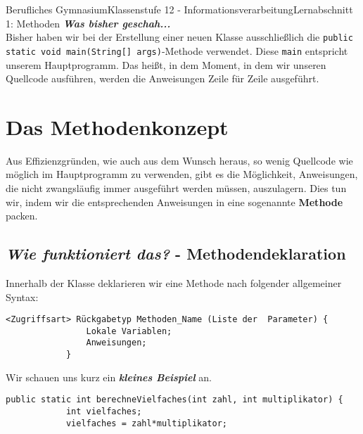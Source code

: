 \documentclass[11pt,oneside,openany,headings=optiontotoc,11pt,numbers=noenddot]{article}
\begin{document}
	\begin{worksheet}{Berufliches Gymnasium}{Klassenstufe 12 - Informationsverarbeitung}{Lernabschnitt 1: Methoden}
		\setlength{\columnseprule}{0pt}
		\setcounter{section}{2}
		\textit{\textbf{Was bisher geschah...}}\\
		Bisher haben wir bei der Erstellung einer neuen Klasse ausschließlich die \lstinline[style=JavaInputStyle,backgroundcolor=\color{backcolor}]|public static void main(String[] args)|-Methode verwendet. Diese \lstinline[style=JavaInputStyle,backgroundcolor=\color{backcolor}]|main| entspricht unserem Hauptprogramm. Das heißt, in dem Moment, in dem wir unseren Quellcode ausführen, werden die Anweisungen Zeile für Zeile ausgeführt.\\
		\section{Das Methodenkonzept}
		Aus Effizienzgründen, wie auch aus dem Wunsch heraus, so wenig Quellcode wie möglich im Hauptprogramm zu verwenden, gibt es die Möglichkeit, Anweisungen, die nicht zwangsläufig immer ausgeführt werden müssen, auszulagern. Dies tun wir, indem wir die entsprechenden Anweisungen in eine sogenannte \textbf{Methode} packen.
		\subsection{\textit{Wie funktioniert das?} - Methodendeklaration}
		Innerhalb der Klasse deklarieren wir eine Methode nach folgender allgemeiner Syntax:
		\begin{lstlisting}[style=JavaInputStyle]
			<Zugriffsart> Rückgabetyp Methoden_Name (Liste der  Parameter) {
				Lokale Variablen;
				Anweisungen;
			}
		\end{lstlisting}
		Wir schauen uns kurz ein \textit{\textbf{kleines Beispiel}} an.
		\begin{lstlisting}[style=JavaInputStyle]
		public static int berechneVielfaches(int zahl, int multiplikator) {
			int vielfaches;
			vielfaches = zahl*multiplikator;
			

\end{lstlisting}
\end{worksheet}
\end{document}
